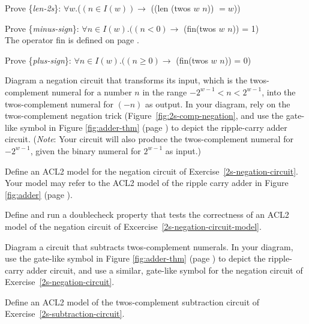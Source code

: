 \begin{ExerciseList}

\Exercise \label{len-2s}
Prove \{\emph{len-2s}\}:
$\forall w$.($(n \in I(w)) \rightarrow$ ((len (twos $w$ $n$)) $= w$))

\Exercise \label{minus-sign}
Prove \{\emph{minus-sign}\}:
$\forall n \in I(w).((n < 0) \rightarrow$ (fin(twos $w$ $n$)) = 1) \\
The operator fin is defined on page \pageref{fin-defun}.

\Exercise \label{plus-sign}
Prove \{\emph{plus-sign}\}:
$\forall n \in I(w).((n \ge 0) \rightarrow$ (fin(twos $w$ $n$)) = $0$)

\Exercise \label{2s-negation-circuit}
Diagram a negation circuit that transforms its input,
which is the twos-complement numeral for a number $n$ in the range
$-2^{w-1} < n < 2^{w-1}$,
into the twos-complement numeral for $(-n)$ as output.
In your diagram, rely on the twos-complement negation trick
(Figure~\ref{fig:2s-comp-negation},
and use the gate-like symbol in
Figure \ref{fig:adder-thm} (page \pageref{fig:adder-thm})
to depict the ripple-carry adder circuit.
(\emph{Note}: Your circuit will also produce the twos-complement
numeral for $-2^{w-1}$, given the binary numeral for $2^{w-1}$
as input.)

\Exercise \label{2s-negation-circuit-model}
Define an ACL2 model for the negation circuit
of Exercise~\ref{2s-negation-circuit}.
Your model may refer to the ACL2 model
of the ripple carry adder in
Figure \ref{fig:adder} (page \pageref{fig:adder}).

\Exercise Define and run a doublecheck property that
tests the correctness of
an ACL2 model of the negation circuit of
Excercise~\ref{2s-negation-circuit-model}.

\Exercise \label{2s-subtraction-circuit}
Diagram a circuit that subtracts twos-complement numerals.
In your diagram, use the gate-like symbol in
Figure \ref{fig:adder-thm} (page \pageref{fig:adder-thm})
to depict the ripple-carry adder circuit,
and use a similar, gate-like symbol for the negation circuit
of Exercise~\ref{2s-negation-circuit}.

\Exercise \label{2s-subtraction-circuit-model}
Define an ACL2 model of the twos-complement
subtraction circuit of Exercise~\ref{2s-subtraction-circuit}.


\end{ExerciseList}
